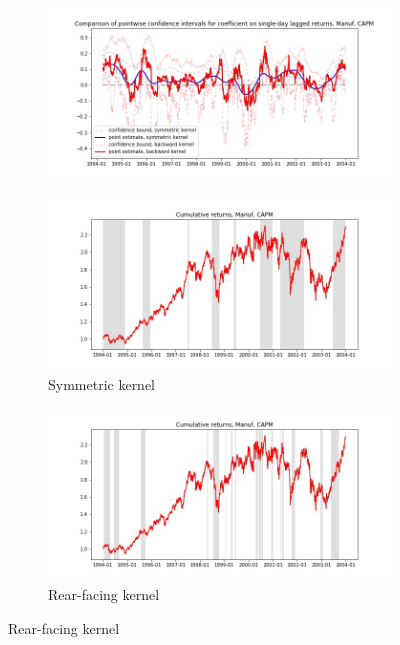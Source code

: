 \documentclass{article}
\begin{document}
\newpage

\begin{figure}

\centering

  \begin{subfigure}[b]{\textwidth}
    \includegraphics[width=\textwidth]{Manuf/pointwiseCIs_layered_CAPM.jpg}
    \label{fig:1}
  \end{subfigure}
  \begin{subfigure}[b]{0.45\textwidth}
    \includegraphics[width=\textwidth]{Manuf/full_cumrets_ofint_CAPM.jpg}
    \caption*{Symmetric kernel}
    \label{fig:2}
  \end{subfigure}
   \begin{subfigure}[b]{0.45\textwidth}
    \includegraphics[width=\textwidth]{Manuf/bwunif_full_cumrets_ofint_CAPM.jpg}
    \caption*{Rear-facing kernel}
    \label{fig:2}
  \end{subfigure}
  
\end{figure}
\end{document}
